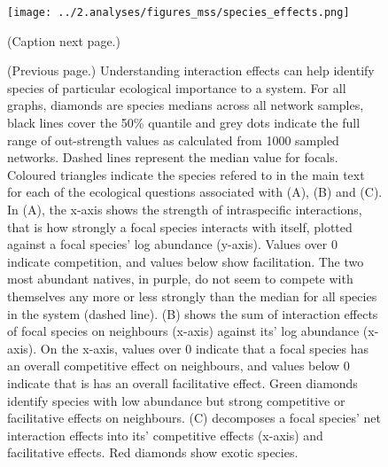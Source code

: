 \documentclass[a4,12pt]{article}
\begin{document}
    \begin{figure}[H]
        \begin{centering}
        \texttt{[image: ../2.analyses/figures\_mss/species\_effects.png]}
        \caption{(Caption next page.)}
        \label{fig:species}
        \end{centering}
    \end{figure} 

    \addtocounter{figure}{-1}
	\begin{figure} [t!]
  		\caption{(Previous page.) Understanding interaction effects can help identify species of particular ecological importance to a system. For all graphs, diamonds are species medians across all network samples, black lines cover the 50\% quantile and grey dots indicate the full range of out-strength values as calculated from 1000 sampled networks. Dashed lines represent the median value for focals. Coloured triangles indicate the species refered to in the main text for each of the ecological questions associated with (A), (B) and (C). \\
        In (A), the x-axis shows the strength of intraspecific interactions, that is how strongly a focal species interacts with itself, plotted against a focal species' log abundance (y-axis). Values over $0$ indicate competition, and values below show facilitation.  The two most abundant natives, in purple, do not seem to compete with themselves any more or less strongly than the median for all species in the system (dashed line). (B) shows the sum of interaction effects of focal species on neighbours (x-axis) against its' log abundance (x-axis). On the x-axis, values over $0$ indicate that a focal species has an overall competitive effect on neighbours, and values below $0$ indicate that is has an overall facilitative effect. Green diamonds identify species with low abundance but strong competitive or facilitative effects on neighbours. (C) decomposes a focal species' net interaction effects into its' competitive effects (x-axis) and facilitative effects. Red diamonds show exotic species.}%
	\end{figure}

\end{document}
